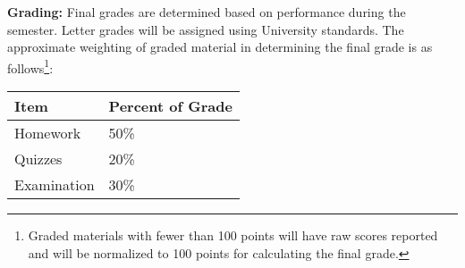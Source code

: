 \documentclass[12pt]{article}
\begin{document}
\textbf{Grading:} Final grades are determined based on performance during the semester.  Letter grades will be assigned using University standards.  The approximate weighting of graded material in determining the final grade is as follows\footnote{Graded materials with fewer than 100 points will have raw scores reported and will be normalized to 100 points for calculating the final grade.}:
\begin{table}[htbp]
   \centering

   \begin{tabular}{l l}
Item & Percent of Grade \\
\hline
\hline
Homework & 50\% \\
Quizzes & 20\% \\
Examination& 30\% \\
\hline
\end{tabular}

\end{table}
\end{document}
